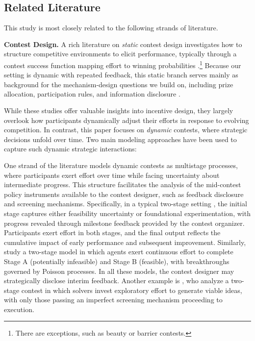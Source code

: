 \documentclass[mnsc]{informs3}
\begin{document}
\subsection{Related Literature}

This study is most closely related to the following strands of literature.

\textbf{Contest Design.}
A rich literature on \textit{static} contest design \citep{ales2017optimal_award} investigates how to structure competitive environments to elicit performance, typically through a contest success function mapping effort to winning probabilities \citep{skaperdas1996contest}.\footnote{There are exceptions, such as beauty or barrier contests.}
Because our setting is dynamic with repeated feedback, this static branch serves mainly as background for the mechanism-design questions we build on, including prize allocation, participation rules, and information disclosure \citep{moldovanu2001optimal, ales2021number_of_players, bergemann2022optimal}.


While these studies offer valuable insights into incentive design, they largely overlook how participants dynamically adjust their efforts in response to evolving competition.
In contrast, this paper focuses on \textit{dynamic} contests, where strategic decisions unfold over time.
Two main modeling approaches have been used to capture such dynamic strategic interactions:

One strand of the literature models dynamic contests as multistage processes, where participants exert effort over time while facing uncertainty about intermediate progress.
This structure facilitates the analysis of the mid-contest policy instruments available to the contest designer, such as feedback disclosure and screening mechanisms.
Specifically, in a typical two-stage setting \citep{aoyagi2010information, mihm2019feedback}, the initial stage captures either feasibility uncertainty or foundational experimentation, with progress revealed through milestone feedback provided by the contest organizer.
Participants exert effort in both stages, and the final output reflects the cumulative impact of early performance and subsequent improvement.
Similarly, \citet{bimpikis2019designing} study a two-stage model in which agents exert continuous effort to complete Stage A (potentially infeasible) and Stage B (feasible), with breakthroughs governed by Poisson processes.
In all these models, the contest designer may strategically disclose interim feedback.
Another example is \citet{Khorasani2023screening}, who analyze a two-stage contest in which solvers invest exploratory effort to generate viable ideas, with only those passing an imperfect screening mechanism proceeding to execution.
\end{document}
